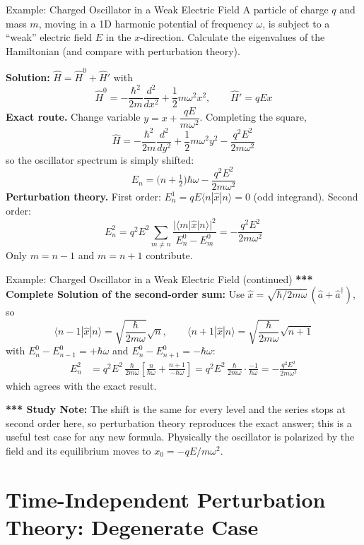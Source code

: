 \documentclass[11pt,a4paper]{article}
\begin{document}
\begin{prob}{Example: Charged Oscillator in a Weak Electric Field}
A particle of charge $q$ and mass $m$, moving in a 1D harmonic potential of frequency $\omega$, is subject to a ``weak'' electric field $E$ in the $x$-direction. Calculate the eigenvalues of the Hamiltonian (and compare with perturbation theory).

\textbf{Solution:} $\hat H = \hat H^0 + \hat H'$ with
\[
\hat H^0 = -\frac{\hbar^2}{2m}\frac{d^2}{dx^2} + \frac12 m\omega^2x^2, \qquad \hat H' = qEx
\]
\textbf{Exact route.} Change variable $y = x + \dfrac{qE}{m\omega^2}$. Completing the square,
\[
\hat H = -\frac{\hbar^2}{2m}\frac{d^2}{dy^2} + \frac12 m\omega^2y^2 - \frac{q^2E^2}{2m\omega^2}
\]
so the oscillator spectrum is simply shifted:
\[
\boxed{E_n = \Big(n+\tfrac12\Big)\hbar\omega - \frac{q^2E^2}{2m\omega^2}}
\]
\textbf{Perturbation theory.} First order: $E_n^{1} = qE\langle n|\hat x|n\rangle = 0$ (odd integrand). Second order:
\[
E_n^{2} = q^2E^2\sum_{m\ne n}\frac{|\langle m|\hat x|n\rangle|^2}{E_n^0 - E_m^0} = -\frac{q^2E^2}{2m\omega^2}
\]
Only $m = n-1$ and $m = n+1$ contribute.
\end{prob}

\begin{prob}{Example: Charged Oscillator in a Weak Electric Field (continued)}
\textbf{*** Complete Solution of the second-order sum:} Use $\hat x = \sqrt{\hbar/2m\omega}\,(\hat a + \hat a^\dagger)$, so
\[
\langle n-1|\hat x|n\rangle = \sqrt{\frac{\hbar}{2m\omega}}\sqrt n, \qquad \langle n+1|\hat x|n\rangle = \sqrt{\frac{\hbar}{2m\omega}}\sqrt{n+1}
\]
with $E_n^0 - E_{n-1}^0 = +\hbar\omega$ and $E_n^0 - E_{n+1}^0 = -\hbar\omega$:
\begin{align*}
E_n^{2} &= q^2E^2\,\frac{\hbar}{2m\omega}\left[\frac{n}{\hbar\omega} + \frac{n+1}{-\hbar\omega}\right]
= q^2E^2\,\frac{\hbar}{2m\omega}\cdot\frac{-1}{\hbar\omega} = -\frac{q^2E^2}{2m\omega^2}
\end{align*}
which agrees with the exact result.

\textbf{*** Study Note:} The shift is the same for every level and the series stops at second order here, so perturbation theory reproduces the exact answer; this is a useful test case for any new formula. Physically the oscillator is polarized by the field and its equilibrium moves to $x_0 = -qE/m\omega^2$.
\end{prob}

\section{Time-Independent Perturbation Theory: Degenerate Case}\label{ap:sec:deg}
\end{document}
